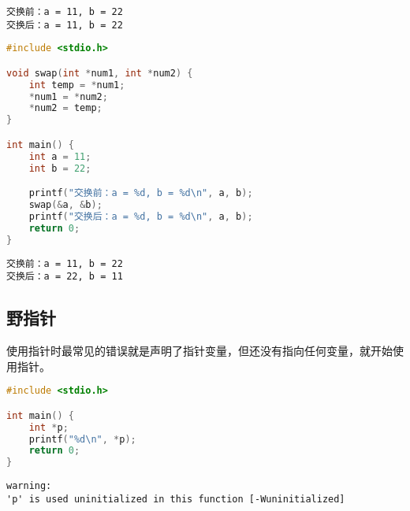 \begin{tcolorbox}
	\begin{verbatim}
交换前：a = 11, b = 22
交换后：a = 11, b = 22
	\end{verbatim}
\end{tcolorbox}

\vspace{0.5cm}


\begin{lstlisting}[language=C]
#include <stdio.h>

void swap(int *num1, int *num2) {
    int temp = *num1;
    *num1 = *num2;
    *num2 = temp;
}

int main() {
    int a = 11;
    int b = 22;

    printf("交换前：a = %d, b = %d\n", a, b);
    swap(&a, &b);
    printf("交换后：a = %d, b = %d\n", a, b);
    return 0;
}
\end{lstlisting}

\begin{tcolorbox}
	\begin{verbatim}
交换前：a = 11, b = 22
交换后：a = 22, b = 11
	\end{verbatim}
\end{tcolorbox}

\vspace{0.5cm}

\subsection{野指针}

使用指针时最常见的错误就是声明了指针变量，但还没有指向任何变量，就开始使用指针。\\


\begin{lstlisting}[language=C]
#include <stdio.h>

int main() {
    int *p;
    printf("%d\n", *p);
    return 0;
}
\end{lstlisting}

\begin{tcolorbox}
	\begin{verbatim}
warning:
'p' is used uninitialized in this function [-Wuninitialized]
	\end{verbatim}
\end{tcolorbox}

